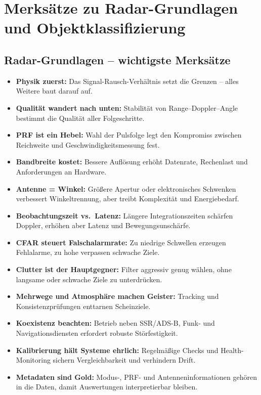 \section{Merksätze zu Radar-Grundlagen und Objektklassifizierung}

\subsection{Radar-Grundlagen – wichtigste Merksätze}
\begin{itemize}
  \item \textbf{Physik zuerst:} Das Signal-Rausch-Verhältnis setzt die Grenzen – alles Weitere baut darauf auf.
  \item \textbf{Qualität wandert nach unten:} Stabilität von Range–Doppler–Angle bestimmt die Qualität aller Folgeschritte.
  \item \textbf{PRF ist ein Hebel:} Wahl der Pulsfolge legt den Kompromiss zwischen Reichweite und Geschwindigkeitsmessung fest.
  \item \textbf{Bandbreite kostet:} Bessere Auflösung erhöht Datenrate, Rechenlast und Anforderungen an Hardware.
  \item \textbf{Antenne = Winkel:} Größere Apertur oder elektronisches Schwenken verbessert Winkeltrennung, aber treibt Komplexität und Energiebedarf.
  \item \textbf{Beobachtungszeit vs.\ Latenz:} Längere Integrationszeiten schärfen Doppler, erhöhen aber Latenz und Bewegungsunschärfe.
  \item \textbf{CFAR steuert Falschalarmrate:} Zu niedrige Schwellen erzeugen Fehlalarme, zu hohe verpassen schwache Ziele.
  \item \textbf{Clutter ist der Hauptgegner:} Filter aggressiv genug wählen, ohne langsame oder schwache Ziele zu unterdrücken.
  \item \textbf{Mehrwege und Atmosphäre machen Geister:} Tracking und Konsistenzprüfungen enttarnen Scheinziele.
  \item \textbf{Koexistenz beachten:} Betrieb neben SSR/ADS-B, Funk- und Navigationsdiensten erfordert robuste Störfestigkeit.
  \item \textbf{Kalibrierung hält Systeme ehrlich:} Regelmäßige Checks und Health-Monitoring sichern Vergleichbarkeit und verhindern Drift.
  \item \textbf{Metadaten sind Gold:} Modus-, PRF- und Antenneninformationen gehören in die Daten, damit Auswertungen interpretierbar bleiben.
\end{itemize}

